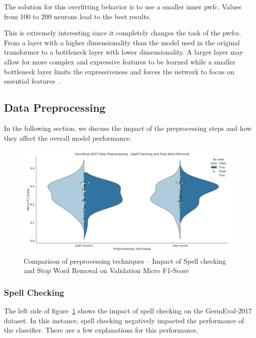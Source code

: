 The solution for this overfitting behavior is to use a smaller inner \gls{pwfc}. Values from 100 to 200 neurons lead to the best results.

This is extremely interesting since it completely changes the task of the \glspl{pwfc}. From a layer with a higher dimensionality than the model used in the original transformer to a bottleneck layer with lower dimensionality. A larger layer may allow for more complex and expressive features to be learned while a smaller bottleneck layer limits the expressiveness and forces the network to focus on essential features~\cite{Ramsundar2015}.

\subsection{Data Preprocessing}
\label{subsec:06_dataPreprocessing}
In the following section, we discuss the impact of the preprocessing steps and how they affect the overall model performance. 

\begin{figure}
    \centering
    \includegraphics[width=\textwidth]{figures/06_results/06_hp_ge_vio_data}
    \caption{Comparison of preprocessing techniques -- Impact of Spell checking and Stop Word Removal on Validation Micro F1-Score}
    \label{fig:06_PreprocessingHp}
\end{figure}

\subsubsection{Spell Checking}
\label{sec:06_spellChecking}

The left side of figure~\ref{fig:06_PreprocessingHp} shows the impact of spell checking on the GermEval-2017 dataset. In this instance, spell checking negatively impacted the performance of the classifier. There are a few explanations for this performance.
\bigskip

